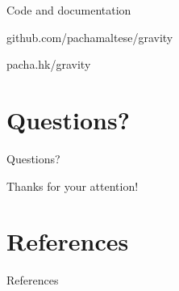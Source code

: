 \documentclass[ignorenonframetext,compress,aspectratio=169]{beamer}
\newif\ifbibliography
\begin{document}
\begin{frame}{Code and documentation}

\LARGE{github.com/pachamaltese/gravity}

\LARGE{pacha.hk/gravity}

\end{frame}

\section{Questions?}\label{questions}

\begin{frame}{Questions?}

\LARGE{Thanks for your attention!}

\end{frame}

\section{References}\label{references}

\begin{frame}{References}

\end{frame}

\begin{frame}[allowframebreaks]{}
\bibliographytrue

\end{frame}
\end{document}

